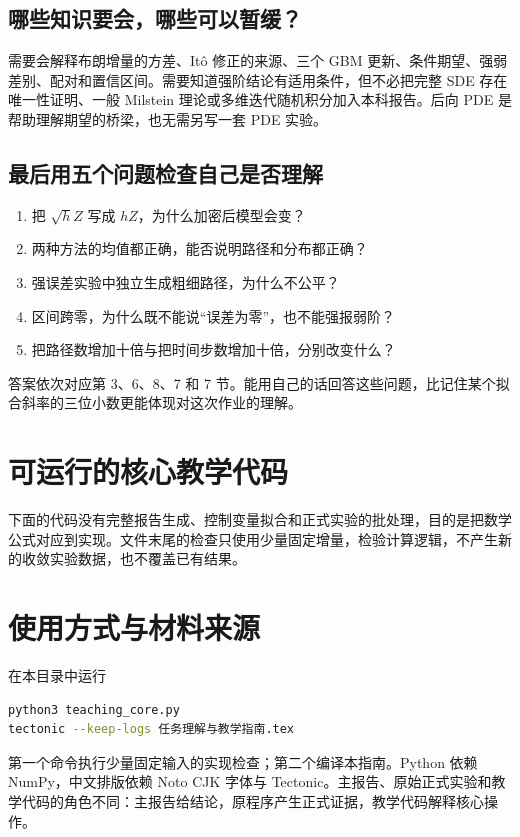 \documentclass[11pt,a4paper,fontset=none]{ctexart}
\begin{document}
\subsection*{哪些知识要会，哪些可以暂缓？}
需要会解释布朗增量的方差、It\^o 修正的来源、三个 GBM 更新、条件期望、强弱差别、配对和置信区间。需要知道强阶结论有适用条件，但不必把完整 SDE 存在唯一性证明、一般 Milstein 理论或多维迭代随机积分加入本科报告。后向 PDE 是帮助理解期望的桥梁，也无需另写一套 PDE 实验。

\subsection*{最后用五个问题检查自己是否理解}
\begin{enumerate}
\item 把 $\sqrt h Z$ 写成 $hZ$，为什么加密后模型会变？
\item 两种方法的均值都正确，能否说明路径和分布都正确？
\item 强误差实验中独立生成粗细路径，为什么不公平？
\item 区间跨零，为什么既不能说“误差为零”，也不能强报弱阶？
\item 把路径数增加十倍与把时间步数增加十倍，分别改变什么？
\end{enumerate}
答案依次对应第 3、6、8、7 和 7 节。能用自己的话回答这些问题，比记住某个拟合斜率的三位小数更能体现对这次作业的理解。

\newpage
\appendix
\section{可运行的核心教学代码}
下面的代码没有完整报告生成、控制变量拟合和正式实验的批处理，目的是把数学公式对应到实现。文件末尾的检查只使用少量固定增量，检验计算逻辑，不产生新的收敛实验数据，也不覆盖已有结果。



\newpage
\section{使用方式与材料来源}
在本目录中运行
\begin{lstlisting}[language=bash]
python3 teaching_core.py
tectonic --keep-logs 任务理解与教学指南.tex
\end{lstlisting}
第一个命令执行少量固定输入的实现检查；第二个编译本指南。Python 依赖 NumPy，中文排版依赖 Noto CJK 字体与 Tectonic。主报告、原始正式实验和教学代码的角色不同：主报告给结论，原程序产生正式证据，教学代码解释核心操作。
\end{document}
